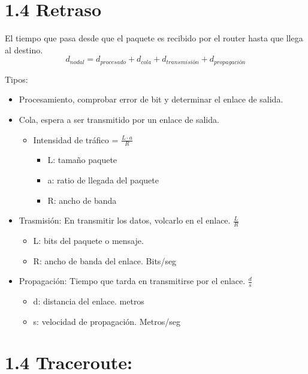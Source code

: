 \documentclass[12pt, twoside, openright]{report} %
\begin{document}
\section{1.4 Retraso}

El tiempo que pasa desde que el paquete es recibido por el router hasta
que llega al destino.
$$d_{nodal}= d_{procesado}+d_{cola}+d_{transmisión}+d_{propagación}$$
\pagebreak

Tipos:

\begin{itemize}
	\item Procesamiento, comprobar error de bit y determinar el enlace de
	      salida.
	\item Cola, espera a ser transmitido por un enlace de salida.

	      \begin{itemize}
		      \item Intensidad de tráfico = \(\frac{L\cdot a}{R}\)

		            \begin{itemize}
			            \item L: tamaño paquete
			            \item a: ratio de llegada del paquete
			            \item R: ancho de banda
		            \end{itemize}
	      \end{itemize}
	\item Trasmisión: En transmitir los datos, volcarlo en el enlace.
	      \(\frac{L}{R}\)

	      \begin{itemize}
		      \item L: bits del paquete o mensaje.
		      \item R: ancho de banda del enlace. Bits/seg
	      \end{itemize}
	\item Propagación: Tiempo que tarda en transmitirse por el enlace.
	      \(\frac{d}{s}\)

	      \begin{itemize}
		      \item d: distancia del enlace. metros
		      \item s: velocidad de propagación. Metros/seg
	      \end{itemize}

\end{itemize}

\section{1.4 Traceroute:}
\end{document}
